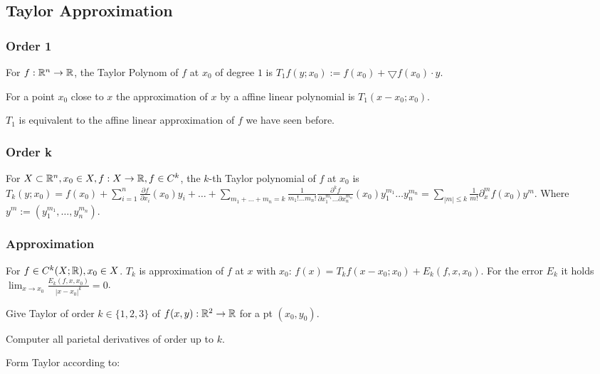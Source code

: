 \subsection{Taylor Approximation}
\subsubsection{Order 1}
For $f: \mathbb{R}^n \to \mathbb{R}$, the Taylor Polynom of $f$ at $x_0$ of degree $1$ is $T_1f(y; x_0) := f(x_0) + \bigtriangledown f(x_0) \cdot y$.

For a point $x_0$ close to $x$ the approximation of $x$ by a affine linear polynomial is $T_1(x - x_0; x_0)$.

\begin{compactitem}
    \item $T_1$ is equivalent to the affine linear approximation of $f$ we have seen before.
\end{compactitem}

\subsubsection{Order k}
For $X \subset \mathbb{R}^n, x_0 \in X, f: X \to \mathbb{R}, f \in C^k$, the $k$-th Taylor polynomial of $f$ at $x_0$ is $T_k(y; x_0) = f(x_0) + \sum_{i=1}^{n} \frac{\partial f}{\partial x_i} (x_0) y_i + \dots + \sum_{m_1 + \dots + m_n = k} \frac{1}{m_1! \dots m_n!}\frac{\partial^k f}{\partial x_1^{m_1} \dots \partial x_n^{m_n}}(x_0)y_1^{m_1} \dots y_n^{m_n} = \sum_{|m| \le k} \frac{1}{m!} \partial_x^m f(x_0) y^m$. Where $y^m := (y_1^{m_1}, \dots , y_n^{m_n})$.

\subsubsection{Approximation}
For $f \in C^k(X; \mathbb{R}), x_0 \in X$. $T_k$ is approximation of $f$ at $x$ with $x_0$: $f(x) = T_kf(x - x_0; x_0) + E_k(f, x, x_0)$. For the error $E_k$ it holds $\lim_{x \to x_0} \frac{E_k(f, x, x_0)}{|x - x_0|^k} = 0$.

Give Taylor of order $k \in \{1, 2, 3\}$ of $f(x, y): \mathbb{R}^2 \to \mathbb{R}$ for a pt $(x_0, y_0)$.

\begin{compactitem}
    \item Computer all parietal derivatives of order up to $k$.
    \item Form Taylor according to:
\end{compactitem}

